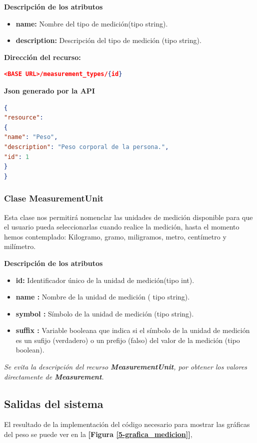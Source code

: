 \textbf{Descripción de los atributos}
\begin{itemize}
	\item \textbf{name: }	Nombre del tipo de medición(tipo string).
	\item \textbf{description:} Descripción del tipo de medición (tipo string).
\end{itemize}

\textbf{Dirección del recurso:}
\begin{lstlisting}[language=json,firstnumber=1]
<BASE URL>/measurement_types/{id}
\end{lstlisting}

\textbf{Json generado por la API} 
\begin{lstlisting}[language=json,firstnumber=1]
{
"resource": 
{
"name": "Peso",
"description": "Peso corporal de la persona.",
"id": 1
}
}
\end{lstlisting}


\subsubsection{Clase MeasurementUnit}
Esta clase nos permitirá  nomenclar  las unidades de medición disponible para que el usuario pueda seleccionarlas cuando realice la medición, hasta el momento hemos contemplado: Kilogramo, gramo, miligramos, metro, centímetro y milímetro.

\textbf{Descripción de los atributos}
\begin{itemize}
	\item \textbf{id:	}	Identificador único de la unidad de medición(tipo int).
	\item \textbf{name :	}	Nombre de la unidad de medición ( tipo string).
	\item \textbf{symbol :}		Símbolo de la unidad de medición (tipo string).
	\item \textbf{suffix :}	Variable booleana que indica si el símbolo de la unidad de medición es un sufijo (verdadero) o un prefijo (falso) del valor de la medición (tipo boolean).
\end{itemize}

\textit{Se evita la descripción del recurso \textbf{MeasurementUnit}, por obtener los valores directamente de \textbf{Measurement}.}



\subsection{Salidas del sistema}
El resultado de la implementación del código necesario para mostrar las gráficas del peso se puede ver en la \textbf{[Figura \ref{5-grafica_medicion}]}, 


